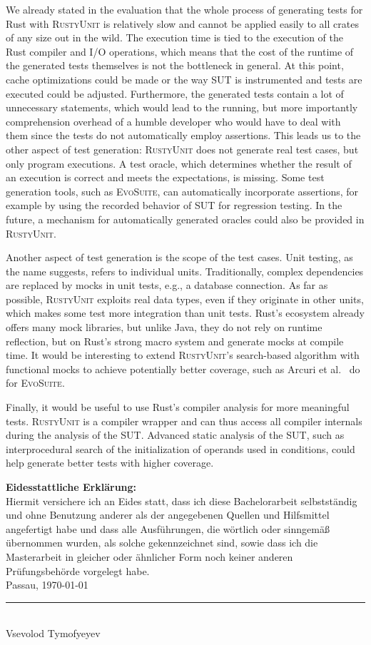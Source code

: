\documentclass[paper=a4,%
  twoside,%
  BCOR4mm,%
  abstract=true,%
  toc=bibliography,%
  chapterprefix=true,%
  toc=bibliographynumbered,%
  open=right,%
  english,%
  pagesize=pdftex]{scrreprt}
\newcommand{\tech}{\textsc{RustyUnit}\xspace}
\begin{document}
We already stated in the evaluation that the whole process of generating tests for Rust with \tech is relatively slow and cannot be applied easily to all crates of any size out in the wild. The execution time is tied to the execution of the Rust compiler and I/O operations, which means that the cost of the runtime of the generated tests themselves is not the bottleneck in general. At this point, cache optimizations could be made or the way \ac{SUT} is instrumented and tests are executed could be adjusted. Furthermore, the generated tests contain a lot of unnecessary statements, which would lead to the running, but more importantly comprehension overhead of a humble developer who would have to deal with them since the tests do not automatically employ assertions. This leads us to the other aspect of test generation: \tech does not generate real test cases, but only program executions. A test oracle, which determines whether the result of an execution is correct and meets the expectations, is missing. Some test generation tools, such as \textsc{EvoSuite}, can automatically incorporate assertions, for example by using the recorded behavior of \ac{SUT} for regression testing. In the future, a mechanism for automatically generated oracles could also be provided in \tech.

Another aspect of test generation is the scope of the test cases. Unit testing, as the name suggests, refers to individual units. Traditionally, complex dependencies are replaced by mocks in unit tests, e.g., a database connection. As far as possible, \tech exploits real data types, even if they originate in other units, which makes some test more integration than unit tests. Rust's ecosystem already offers many mock libraries, but unlike Java, they do not rely on runtime reflection, but on Rust's strong macro system and generate mocks at compile time. It would be interesting to extend \tech's search-based algorithm with functional mocks to achieve potentially better coverage, such as Arcuri et al.~\cite{Arcuri2017} do for \textsc{EvoSuite}.

Finally, it would be useful to use Rust's compiler analysis for more meaningful tests. \tech is a compiler wrapper and can thus access all compiler internals during the analysis of the \ac{SUT}. Advanced static analysis of the \ac{SUT}, such as interprocedural search of the initialization of operands used in conditions, could help generate better tests with higher coverage. 


\backmatter%
\appendix
\cleardoublepage
\thispagestyle{empty}
\null\vfill
\noindent\textbf{Eidesstattliche Erklärung:}\\[1.5ex]
Hiermit versichere ich an Eides statt, dass ich diese Bachelorarbeit
selbstständig und ohne Benutzung anderer als der angegebenen Quellen und
Hilfsmittel angefertigt habe und dass alle Ausführungen, die wörtlich oder
sinngemäß übernommen wurden, als solche gekennzeichnet sind, sowie dass ich die
Masterarbeit in gleicher oder ähnlicher Form noch keiner anderen
Prüfungsbehörde vorgelegt habe.\\[1.5cm]
Passau, \today\quad\rule{6cm}{0.1mm}\\
\null\hspace{5cm} {\small Vsevolod Tymofyeyev}

\clearpage


\clearpage
\printbibliography
\end{document}
